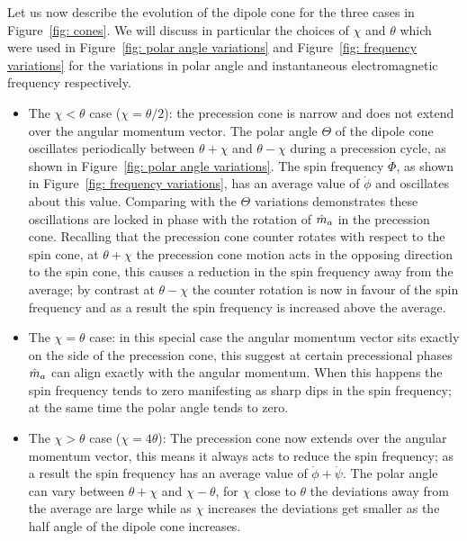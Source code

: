 \documentclass[../full_thesis/full_thesis.tex]{subfiles}
\begin{document}
Let us now describe
the evolution of the dipole cone for the three cases in Figure~\ref{fig: cones}.
We will discuss in particular the choices of $\chi$ and $\theta$ which were used
in Figure~\ref{fig: polar angle variations} and Figure~\ref{fig: frequency variations}
for the variations in polar angle and instantaneous electromagnetic frequency
respectively.
\begin{itemize}
\item The $\chi < \theta$ case ($\chi = \theta/2$): the precession cone is
narrow and does not extend over the angular momentum vector. The polar angle
$\Theta$ of the dipole cone oscillates periodically between $\theta+\chi$ and
$\theta-\chi$ during a precession cycle, as shown in Figure~\ref{fig: polar angle
variations}.  The spin frequency $\dot{\Phi}$, as shown in Figure~\ref{fig: frequency
variations}, has an average value of $\dot{\phi}$ and oscillates about this
value. Comparing with the $\Theta$ variations demonstrates these oscillations
are locked in phase with the rotation of $\hat{m}_a$ in the precession cone. Recalling
that the precession cone counter rotates with respect to the spin cone, at
$\theta+\chi$ the precession cone motion acts in the opposing direction to the
spin cone, this causes a reduction in the spin frequency away from the average;
by contrast at $\theta-\chi$ the counter rotation is now in favour of the spin
frequency and as a result the spin frequency is increased above the average.

\item The $\chi = \theta$ case: in this special case the angular momentum vector sits exactly
on the side of the precession cone, this suggest at certain precessional phases $\hat{m}_a$ can align exactly with
the angular momentum. When this happens the spin frequency tends to zero manifesting as sharp dips in the
spin frequency; at the same time the polar angle tends to zero.

\item The $\chi > \theta$ case ($\chi = 4\theta$): The precession cone now extends over the
angular momentum vector, this means it always acts to reduce the spin
frequency; as a result the spin frequency has an average value of
$\dot{\phi} + \dot{\psi}$. The polar angle can vary between $\theta+\chi$ and
$\chi-\theta$, for $\chi$ close to $\theta$ the deviations away from the
average are large while as $\chi$ increases the deviations get smaller as
the half angle of the dipole cone increases.
\end{itemize}
\end{document}
